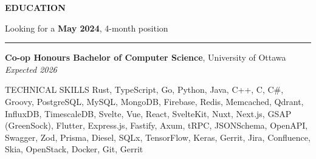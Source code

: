 \documentclass{resume}
\begin{document}
\color{primary}

\vspace{-8pt}

\sectionskip
\MakeUppercase{{\bf Education}}
\vspace{-21pt}
\begin{flushright}
	{Looking for a \textbf{May 2024}, 4-month position}
\end{flushright}
\sectionlineskip
\hrule
\begin{list}{}{
		\setlength{\leftmargin}{0em}
	}
	\item[] \textbf{Co-op Honours Bachelor of Computer Science}, University of Ottawa \hfill \textit{Expected 2026}
\end{list}

\vspace{-6pt}

\begin{rSection}{TECHNICAL SKILLS}
	Rust, TypeScript, Go, Python, Java, C++, C, C\#, Groovy,
	PostgreSQL, MySQL, MongoDB, Firebase, Redis, Memcached,
	Qdrant,
	InfluxDB, TimescaleDB,
	Svelte, Vue, React, SvelteKit, Nuxt, Next.js,
	GSAP (GreenSock), Flutter,
	Express.js, Fastify, Axum, tRPC,
	JSONSchema, OpenAPI, Swagger, Zod,
	Prisma, Diesel, SQLx,
	TensorFlow, Keras,
	Gerrit, Jira, Confluence,
	Skia, OpenStack, Docker,
	Git, Gerrit
\end{rSection}

\vspace{-8pt}
\end{document}
